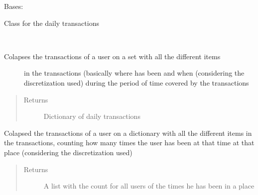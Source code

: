 \documentclass[letterpaper,10pt,english]{sphinxmanual}
\begin{document}
\begin{fulllineitems}
\label{index:SuperHub.Transactions.DailyTransactions}
Bases: {\hyperref[index:SuperHub.Transactions.Transactions]{}}

Class for the daily transactions

\begin{fulllineitems}
\label{index:SuperHub.Transactions.DailyTransactions.colapse}~\begin{description}
\item[{Colapses the transactions of a user on a set with all the different items}] \leavevmode
in the transactions (basically where has been and when (considering the
discretization used) during the period of time covered by the transactions

\end{description}
\begin{quote}\begin{description}
\item[{Returns}] \leavevmode
Dictionary of daily transactions

\end{description}\end{quote}

\end{fulllineitems}


\begin{fulllineitems}
\label{index:SuperHub.Transactions.DailyTransactions.colapse_count}
Colapsed the transactions of a user on a dictionary with all the different items in the
transactions, counting how many times the user has been at that time at that place (considering
the discretization used)
\begin{quote}\begin{description}
\item[{Returns}] \leavevmode
A list with the count for all users of the times he has been in a place

\end{description}\end{quote}


\end{fulllineitems}
\end{fulllineitems}
\end{document}
